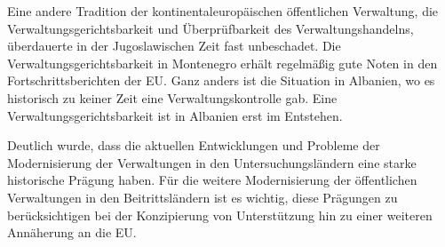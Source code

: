 Eine andere Tradition der kontinentaleuropäischen öffentlichen Verwaltung, die Verwaltungsgerichtsbarkeit und Überprüfbarkeit des Verwaltungshandelns, überdauerte in der Jugoslawischen Zeit fast unbeschadet. Die Verwaltungsgerichtsbarkeit in Montenegro erhält regelmäßig gute Noten in den Fortschrittsberichten der EU. Ganz anders ist die Situation in Albanien, wo es historisch zu keiner Zeit eine Verwaltungskontrolle gab. Eine Verwaltungsgerichtsbarkeit ist in Albanien erst im Entstehen. \par
Deutlich wurde, dass die aktuellen Entwicklungen und Probleme der Modernisierung der Verwaltungen in den Untersuchungsländern eine starke historische Prägung haben. Für die weitere Modernisierung der öffentlichen Verwaltungen in den Beitrittsländern ist es wichtig, diese Prägungen zu berücksichtigen bei der Konzipierung von Unterstützung hin zu einer weiteren Annäherung an die EU.

